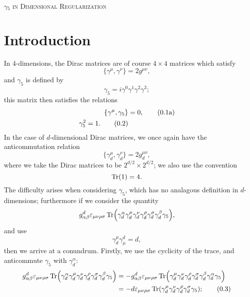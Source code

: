 \documentclass[12pt]{article}
\numberwithin{equation}{section}
\numberwithin{figure}{section}
\numberwithin{table}{section}
\newcommand{\numberthis}{\addtocounter{equation}{1}\tag{\theequation}}
\newcommand{\numberthisa}{\addtocounter{equation}{1}\tag{\theequation a}}
\renewcommand{\theequation}{\arabic{section}.\arabic{equation}}
\begin{document}
	\begin{center}
		{\Huge \scshape \(\gamma_5\) in Dimensional Regularization}
	\end{center}

	\vspace{0.5cm}
	
	\section{Introduction}

        In 4-dimensions, the Dirac matrices are of course \(4\times 4\) matrices which satisfy 
	\begin{equation}
	\{\gamma^\mu,\gamma^\nu\}=2g^{\mu\nu},
	\end{equation}
        and \(\gamma_5\) is defined by 
	\begin{equation}
	\gamma_5=i\gamma^0\gamma^1\gamma^2\gamma^3;
	\end{equation}
        this matrix then satisfies the relations 
	\begin{align*}
	  \{\gamma^\mu,\gamma_5\} & =0, \numberthisa\\
          \gamma_5^2=1. \numberthis
	\end{align*}
        In the case of \(d\)-dimensional Dirac matrices, we once again have the anticommutation relation 
	\begin{equation}
	\{\gamma_d^\mu,\gamma_d^\nu\}=2g_d^{\mu\nu},
	\end{equation}
        where we take the Dirac matrices to be \(2^{d/2}\times 2^{d/2}\); we also use the convention 
	\begin{equation}
	\Tr(1)=4.
	\end{equation}
        The difficulty arises when considering \(\gamma_5\), which has no analagous definition in \(d\)-dimensions; furthermore if we consider the quantity 
	\begin{equation}
	g_{\alpha\beta}^d\varepsilon_{\mu\nu\rho\sigma}\Tr(\gamma_d^\alpha\gamma_d^\mu\gamma_d^\nu\gamma_d^\rho\gamma_d^\sigma\gamma_d^\beta\gamma_5),
	\end{equation}
        and use 
	\begin{equation}
	\gamma_d^\mu\gamma_\mu^d=d,
	\end{equation}
        then we arrive at a conundrum. Firstly, we use the cyclicity of the trace, and anticommute \(\gamma_5\) with \(\gamma_d^\alpha\): 
	\begin{align*}
	  g_{\alpha\beta}^d\varepsilon_{\mu\nu\rho\sigma}\Tr(\gamma_d^\alpha\gamma_d^\mu\gamma_d^\nu\gamma_d^\rho\gamma_d^\sigma\gamma_d^\beta\gamma_5) & =-g_{\alpha\beta}^d\varepsilon_{\mu\nu\rho\sigma}\Tr(\gamma_d^\mu\gamma_d^\nu\gamma_d^\rho\gamma_d^\sigma\gamma_d^\beta\gamma_d^\alpha\gamma_5)\\
          & =-d\varepsilon_{\mu\nu\rho\sigma}\Tr(\gamma_d^\mu\gamma_d^\nu\gamma_d^\rho\gamma_d^\sigma\gamma_5); \numberthis \label{intro1}
	\end{align*}
\end{document}
